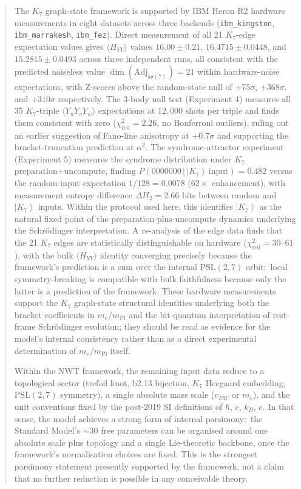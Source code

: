 \documentclass[11pt]{article}
\newcommand{\so}{\mathfrak{so}}
\newcommand{\Adj}{\mathrm{Adj}}
\newcommand{\ket}[1]{\left|#1\right\rangle}
\newcommand{\mPl}{m_{\mathrm{Pl}}}
\newcommand{\PSL}{\mathrm{PSL}}
\begin{document}
\begin{abstract}
The $K_7$ graph-state framework is supported by IBM Heron R2 hardware
measurements in eight datasets across three backends
(\texttt{ibm\_kingston}, \texttt{ibm\_marrakesh}, \texttt{ibm\_fez}).
Direct measurement of all 21 $K_7$-edge expectation values gives
$\langle H_{YY}\rangle$ values $16.00 \pm 0.21$, $16.4715 \pm 0.0448$,
and $15.2815 \pm 0.0493$ across three independent runs, all
consistent with the predicted noiseless value
$\dim(\Adj_{\so(7)}) = 21$ within hardware-noise expectations,
with Z-scores above the random-state null of $+75\sigma$,
$+368\sigma$, and $+310\sigma$ respectively.  The 3-body null test
(Experiment 4) measures all 35 $K_7$-triple $\langle Y_uY_vY_w\rangle$
expectations at $12{,}000$ shots per triple and finds them consistent
with zero ($\chi^2_{\text{red}} = 2.26$, no Bonferroni outliers),
ruling out an earlier suggestion of Fano-line anisotropy at
$+0.7\sigma$ and supporting the bracket-truncation prediction at
$\alpha^2$.  The syndrome-attractor experiment (Experiment 5)
measures the syndrome distribution under $K_7$ preparation+uncompute,
finding $P(0000000\,|\,\ket{K_7}\,\text{input}) = 0.482$ versus
the random-input expectation $1/128 = 0.0078$ ($62\times$ enhancement),
with measurement entropy difference $\Delta H_2 = 2.66$ bits between
random and $\ket{K_7}$ inputs.  Within the protocol used here, this
identifies $\ket{K_7}$ as the natural fixed point of the
preparation-plus-uncompute dynamics underlying the Schr\"odinger
interpretation.  A re-analysis of the edge data finds that
the 21 $K_7$ edges are statistically distinguishable on hardware
($\chi^2_{\text{red}} = 30$--$61$), with the bulk
$\langle H_{YY}\rangle$ identity converging precisely because the
framework's prediction is a sum over the internal $\mathrm{PSL}(2,7)$
orbit:\ local symmetry-breaking is compatible with bulk faithfulness
because only the latter is a prediction of the framework.  These
hardware measurements support the $K_7$ graph-state structural
identities underlying both the bracket coefficients in $m_e/\mPl$ and
the bit-quantum interpretation of rest-frame Schr\"odinger evolution;
they should be read as evidence for the model's internal consistency
rather than as a direct experimental determination of $m_e/\mPl$
itself.

Within the NWT framework, the remaining input data reduce to a
topological sector (trefoil knot, b2.13 bijection, $K_7$ Heegaard
embedding, $\PSL(2,7)$ symmetry), a single absolute mass scale
($v_{EW}$ or $m_e$), and the unit conventions fixed by the post-2019
SI definitions of $\hbar$, $c$, $k_B$, $e$.  In that sense, the
model achieves a strong form of internal parsimony:\ the Standard
Model's $\sim 30$ free parameters can be organised around one
absolute scale plus topology and a single Lie-theoretic backbone,
once the framework's normalisation choices are fixed.  This is the
strongest parsimony statement presently supported by the framework,
not a claim that no further reduction is possible in any conceivable
theory.
\end{abstract}
\end{document}

